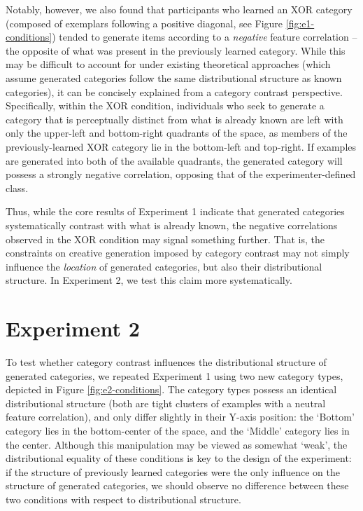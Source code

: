 \documentclass[12pt]{article}
\begin{document}
\begin{flushleft}
Notably, however, we also found that participants who learned an XOR category (composed of exemplars following a positive diagonal, see Figure \ref{fig:e1-conditions}) tended to generate items according to a \textit{negative} feature correlation -- the opposite of what was present in the previously learned category. While this may be difficult to account for under existing theoretical approaches (which assume generated categories follow the same distributional structure as known categories), it can be concisely explained from a category contrast perspective. Specifically, within the XOR condition, individuals who seek to generate a category that is perceptually distinct from what is already known are left with only the upper-left and bottom-right quadrants of the space, as members of the previously-learned XOR category lie in the bottom-left and top-right. If examples are generated into both of the available quadrants, the generated category will possess a strongly negative correlation, opposing that of the experimenter-defined class.

Thus, while the core results of Experiment 1 indicate that generated categories systematically contrast with what is already known, the negative correlations observed in the XOR condition may signal something further. That is, the constraints on creative generation imposed by category contrast may not simply influence the \textit{location} of generated categories, but also their distributional structure. In Experiment 2, we test this claim more systematically.


\section{Experiment 2}

To test whether category contrast influences the distributional structure of generated categories, we repeated Experiment 1 using two new category types, depicted in Figure \ref{fig:e2-conditions}. The category types possess an identical distributional structure (both are tight clusters of examples with a neutral feature correlation), and only differ slightly in their Y-axis position: the `Bottom' category lies in the bottom-center of the space, and the `Middle' category lies in the center. Although this manipulation may be viewed as somewhat `weak', the distributional equality of these conditions is key to the design of the experiment: if the structure of previously learned categories were the only influence on the structure of generated categories, we should observe no difference between these two conditions with respect to distributional structure.


\end{flushleft}
\end{document}
